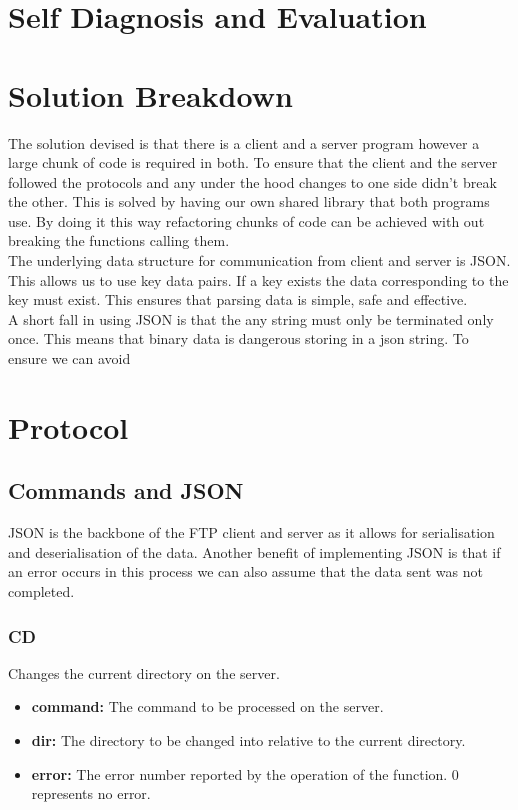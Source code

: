 \documentclass{article}
\begin{document}
\section{Self Diagnosis and Evaluation}


\section{Solution Breakdown}
The solution devised is that there is a client and a server program however a large chunk of code is required in both. To ensure that the client and the server followed the protocols and any under the hood changes to one side didn't break the other. This is solved by having our own shared library that both programs use. By doing it this way refactoring chunks of code can be achieved with out breaking the functions calling them.\\

The underlying data structure for communication from client and server is JSON. This allows us to use key data pairs. If a key exists the data corresponding to the key must exist. This ensures that parsing data is simple, safe and effective.\\

A short fall in using JSON is that the any string must only be terminated only once. This means that binary data is dangerous storing in a json string. To ensure we can avoid

\section{Protocol}
\subsection{Commands and JSON}
JSON is the backbone of the FTP client and server as it allows for serialisation and deserialisation of the data. Another benefit of implementing JSON is that if an error occurs in this process we can also assume that the data sent was not completed.
\subsubsection{CD}
Changes the current directory on the server.
\begin{itemize}
\item \textbf{command:} The command to be processed on the server.
\item \textbf{dir:} The directory to be changed into relative to the current directory. 
\item \textbf{error:} The error number reported by the operation of the function. 0 represents no error.   
\end{itemize}
\end{document}
